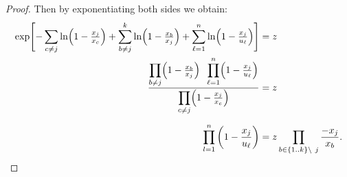 \documentclass[10pt,a4paper]{amsart}
\begin{document}
\begin{proof}
Then by exponentiating both sides we obtain:
\begin{align*}
\exp\Biggl[
  -\sum_{c\neq j}\ln\Bigl(1 - \tfrac{x_j}{x_c}\Bigr)
  + \sum_{b\neq j}^k\ln\Bigl(1 - \tfrac{x_b}{x_j}\Bigr)
  + \sum_{\ell=1}^n\ln\Bigl(1 - \tfrac{x_j}{u_\ell}\Bigr)
\Biggr]
&=z
\\
\frac{
  \displaystyle\prod_{b\neq j}\Bigl(1 - \tfrac{x_b}{x_j}\Bigr)
  \;\;\displaystyle\prod_{\ell=1}^n\Bigl(1 - \tfrac{x_j}{u_\ell}\Bigr)
}{
  \displaystyle\prod_{c\neq j}\Bigl(1 - \tfrac{x_j}{x_c}\Bigr)
}
&=z
\\[6pt]
\prod \limits_{l=1}^n \left(1-\frac{x_j}{u_\ell}\right)&= z \prod \limits_{b\in \{1..k\} \setminus\  j}\frac{-x_j}{x_b} .
\end{align*}
\end{proof}
\end{document}

